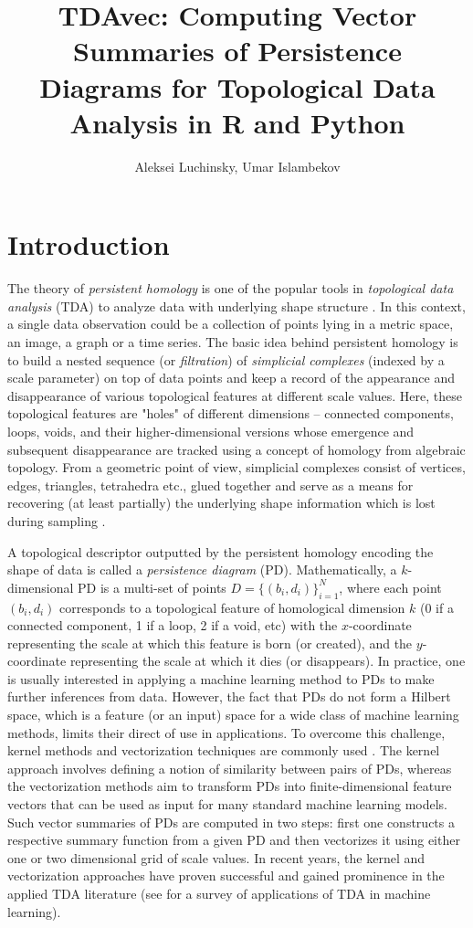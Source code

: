 \documentclass{article}
\title{TDAvec: Computing  Vector Summaries of Persistence Diagrams for Topological
  Data Analysis in R and Python}
\author{Aleksei Luchinsky, Umar Islambekov}
\begin{document}
\maketitle{}

\section{Introduction}


The theory of \emph{persistent homology} is one of the popular tools in \emph{topological data analysis} (TDA) to analyze data with underlying shape structure \cite{Carlsson:2009, edelsbrunner2010computational, chazal2021introduction}. In this context, a single data observation could be a collection of points lying in a metric space, an image, a graph or a time series. The basic idea behind persistent homology is to build a nested sequence (or \emph{filtration}) of \emph{simplicial complexes} (indexed by a scale parameter) on top of data points and keep a record of the appearance and disappearance of various topological features at different scale values. Here, these topological features are "holes" of different dimensions -- connected components, loops, voids, and their higher-dimensional versions whose emergence and subsequent disappearance are tracked using a concept of homology from algebraic topology. From a geometric point of view, simplicial complexes consist of vertices, edges, triangles, tetrahedra etc., glued together and serve as a means for recovering (at least partially) the underlying shape information which is lost during sampling \cite{nanda2013simplicial}.

A topological descriptor outputted by the persistent homology encoding the shape of data is called a \emph{persistence diagram} (PD). Mathematically, a $k$-dimensional PD is a multi-set of points $D=\{(b_i,d_i)\}_{i=1}^N$, where each point $(b_i,d_i)$ corresponds to a topological feature of homological dimension $k$ (0 if a connected component, 1 if a loop, 2 if a void, etc) with the $x$-coordinate representing the scale at which this feature is born (or created), and the $y$-coordinate representing the scale at which it dies (or disappears). In practice, one is usually interested in applying a machine learning method to PDs to make further inferences from data. However, the fact that PDs do not form a Hilbert space, which is a feature (or an input) space for a wide class of machine learning methods, limits their direct of use in applications. To overcome this challenge, kernel methods and vectorization techniques are commonly used \cite{hung2022persistence}. The kernel approach involves defining a notion of similarity between pairs of PDs, whereas the vectorization methods aim to transform PDs into finite-dimensional feature vectors that can be used as input for many standard machine learning models. Such vector summaries of PDs are computed in two steps: first one constructs a respective summary function from a given PD and then vectorizes it using either one or two dimensional grid of scale values. In recent years, the kernel and vectorization approaches have proven successful and gained  prominence in the applied TDA literature (see \cite{hensel2021survey} for a survey of applications of TDA in machine learning).   
\end{document}

